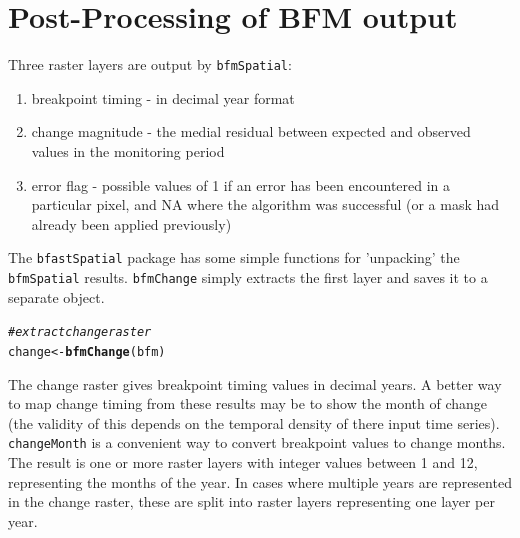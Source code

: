 \documentclass{article}\usepackage[]{graphicx}\usepackage[]{color}
\makeatletter
\newcommand{\hlcom}[1]{\textcolor[rgb]{0.678,0.584,0.686}{\textit{#1}}}%
\newcommand{\hlstd}[1]{\textcolor[rgb]{0.345,0.345,0.345}{#1}}%
\newcommand{\hlkwb}[1]{\textcolor[rgb]{0.69,0.353,0.396}{#1}}%
\newcommand{\hlkwd}[1]{\textcolor[rgb]{0.737,0.353,0.396}{\textbf{#1}}}%
\newenvironment{kframe}{%
 \def\at@end@of@kframe{}%
 \ifinner\ifhmode%
  \def\at@end@of@kframe{\end{minipage}}%
  \begin{minipage}{\columnwidth}%
 \fi\fi%
 \def\FrameCommand##1{\hskip\@totalleftmargin \hskip-\fboxsep
 \colorbox{shadecolor}{##1}\hskip-\fboxsep
     \hskip-\linewidth \hskip-\@totalleftmargin \hskip\columnwidth}%
 \MakeFramed {\advance\hsize-\width
   \@totalleftmargin\z@ \linewidth\hsize
   \@setminipage}}%
 {\par\unskip\endMakeFramed%
 \at@end@of@kframe}
\newenvironment{knitrout}{}{} %
\def\code#1{\texttt{#1}}
\makeatother
\begin{document}

\section{Post-Processing of BFM output}

Three raster layers are output by \code{bfmSpatial}:
\begin{enumerate}
\item breakpoint timing - in decimal year format
\item change magnitude - the medial residual between expected and observed values in the monitoring period
\item error flag - possible values of 1 if an error has been encountered in a particular pixel, and NA where the algorithm was successful (or a mask had already been applied previously)
\end{enumerate}

The \code{bfastSpatial} package has some simple functions for 'unpacking' the \code{bfmSpatial} results. \code{bfmChange} simply extracts the first layer and saves it to a separate object.

\begin{knitrout}
\color{fgcolor}\begin{kframe}
\begin{alltt}
\hlcom{# extract change raster}
\hlstd{change} \hlkwb{<-} \hlkwd{bfmChange}\hlstd{(bfm)}
\end{alltt}
\end{kframe}
\end{knitrout}


The change raster gives breakpoint timing values in decimal years. A better way to map change timing from these results may be to show the month of change (the validity of this depends on the temporal density of there input time series). \code{changeMonth} is a convenient way to convert breakpoint values to change months. The result is one or more raster layers with integer values between 1 and 12, representing the months of the year. In cases where multiple years are represented in the change raster, these are split into raster layers representing one layer per year.
\end{document}
